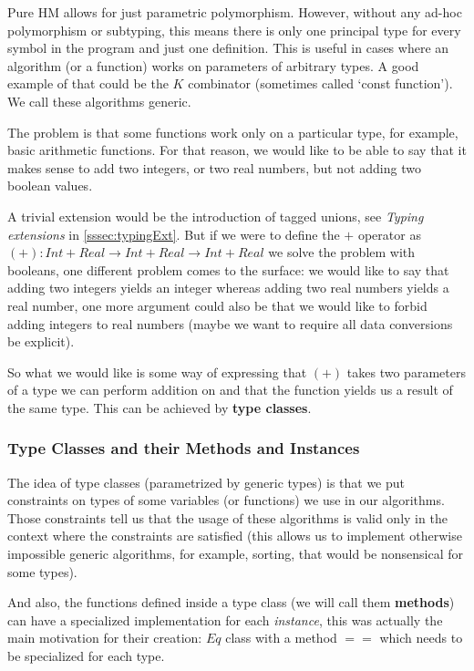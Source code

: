 Pure HM allows for just parametric polymorphism. However, without any ad-hoc polymorphism or subtyping, this means there is only one principal type for every symbol in the program and just one definition. This is useful in cases where an algorithm (or a function) works on parameters of arbitrary types. A good example of that could be the $K$ combinator (sometimes called `const function'). We call these algorithms generic.

The problem is that some functions work only on a particular type, for example, basic arithmetic functions. For that reason, we would like to be able to say that it makes sense to add two integers, or two real numbers, but not adding two boolean values.

A trivial extension would be the introduction of tagged unions, see \emph{Typing extensions} in \ref{sssec:typingExt}. But if we were to define the $+$ operator as $(+) : Int + Real \rightarrow Int + Real \rightarrow Int + Real$ we solve the problem with booleans, one different problem comes to the surface: we would like to say that adding two integers yields an integer whereas adding two real numbers yields a real number, one more argument could also be that we would like to forbid adding integers to real numbers (maybe we want to require all data conversions be explicit).

So what we would like is some way of expressing that $(+)$ takes two parameters of a type we can perform addition on and that the function yields us a result of the same type. This can be achieved by \textbf{type classes}.

\subsubsection{Type Classes and their Methods and Instances}

The idea of type classes (parametrized by generic types) is that we put constraints on types of some variables (or functions) we use in our algorithms. Those constraints tell us that the usage of these algorithms is valid only in the context where the constraints are satisfied (this allows us to implement otherwise impossible generic algorithms, for example, sorting, that would be nonsensical for some types).

And also, the functions defined inside a type class (we will call them \textbf{methods}) can have a specialized implementation for each \emph{instance}, this was actually the main motivation for their creation: $Eq$ class with a method $==$ which needs to be specialized for each type. \cite{hall1994type}

